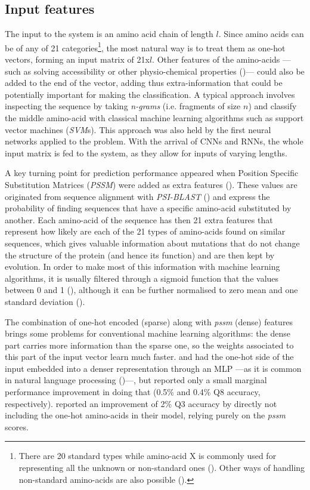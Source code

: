 \subsection{Input features}
The input to the system is an amino acid chain of length $l$. Since amino acids can be of any of 21 categories\footnote{There are 20 standard types while amino-acid X is commonly used for representing all the unknown or non-standard ones (\cite{Zhou2018}). Other ways of handling non-standard amino-acids are also possible (\cite{Fang2017}).}, the most natural way is to treat them as one-hot vectors, forming an input matrix of 21x$l$. Other features of the amino-acids ---such as solving accessibility or other physio-chemical properties (\cite{Fauchere1988})--- could also be added to the end of the vector, adding thus extra-information that could be potentially important for making the classification. A typical approach involves inspecting the sequence by taking \textit{n-grams} (i.e. fragments of size $n$) and classify the middle amino-acid with classical machine learning algorithms such as support vector machines (\textit{SVM}s). This approach was also held by the first neural networks applied to the problem. With the arrival of CNNs and RNNs, the whole input matrix is fed to the system, as they allow for inputs of varying lengths.

A key turning point for prediction performance appeared when Position Specific Substitution Matrices (\textit{PSSM}) were added as extra features (\cite{Yang2018}). These values are originated from sequence alignment with \textit{PSI-BLAST} (\cite{Altschul1997}) and express the probability of finding sequences that have a specific amino-acid substituted by another. Each amino-acid of the sequence has then 21 extra features that represent how likely are each of the 21 types of amino-acids found on similar sequences, which gives valuable information about mutations that do not change the structure of the protein (and hence its function) and are then kept by evolution. In order to make most of this information with machine learning algorithms, it is usually filtered through a sigmoid function that the values between 0 and 1 (\cite{Jones1999}), although it can be further normalised to zero mean and one standard deviation (\cite{Busia2017}).

The combination of one-hot encoded (sparse) along with \textit{pssm} (dense) features brings some problems for conventional machine learning algorithms: the dense part carries more information than the sparse one, so the weights associated to this part of the input vector learn much faster. \cite{Li2016} and \cite{Zhou2018} had the one-hot side of the input embedded into a denser representation through an MLP ---as it is common in natural language processing (\cite{Mesnil2015})---, but reported only a small marginal performance improvement in doing that (0.5\% and 0.4\% Q8 accuracy, respectively). \cite{Spencer2015} reported an improvement of 2\% Q3 accuracy by directly not including the one-hot amino-acids in their model, relying purely on the \textit{pssm} scores.

